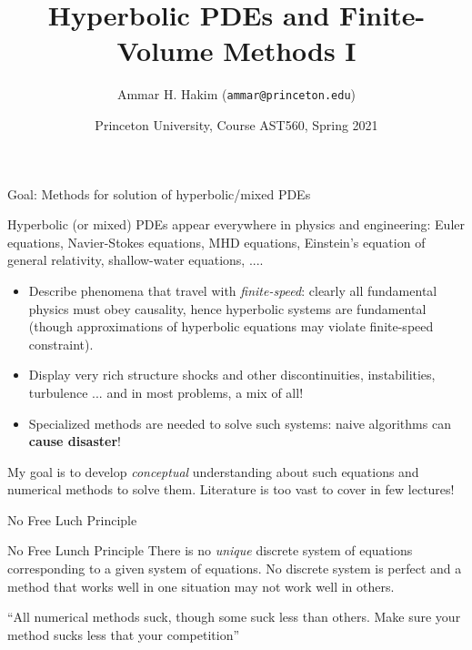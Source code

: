 \documentclass[aspectratio=169]{beamer}
\title[{\tt }]{Hyperbolic PDEs and Finite-Volume Methods I}%
\author[https://ast560.rtfd.io]%
{Ammar H. Hakim ({\tt ammar@princeton.edu}) \inst{1}}%
\institute[PPPL]
{ \inst{1} Princeton Plasma Physics Laboratory, Princeton, NJ %
}
\date[2/9/2021]{Princeton University, Course AST560, Spring 2021}
\newcommand{\mypause}{}
\begin{document}
\begin{frame}[plain]
  \titlepage
\end{frame}

\begin{frame}{Goal: Methods for solution of hyperbolic/mixed PDEs}

  Hyperbolic (or mixed) PDEs appear everywhere in physics and
  engineering: Euler equations, Navier-Stokes equations, MHD
  equations, Einstein's equation of general relativity, shallow-water
  equations, ....%
  \mypause%
  \begin{itemize}
  \item Describe phenomena that travel with \emph{finite-speed}:
    clearly all fundamental physics must obey causality, hence
    hyperbolic systems are fundamental (though approximations of
    hyperbolic equations may violate finite-speed constraint).
    \mypause%
  \item Display very rich structure shocks and other discontinuities,
    instabilities, turbulence ... and in most problems, a mix of all!
    \mypause%
  \item Specialized methods are needed to solve such systems: naive
    algorithms can {\bf cause disaster}!
  \end{itemize}
  \mypause%
  My goal is to develop \emph{conceptual} understanding about such
  equations and numerical methods to solve them. Literature is too
  vast to cover in few lectures!

\end{frame}

\begin{frame}{No Free Luch Principle}

  \begin{block}{No Free Lunch Principle}
    There is no \emph{unique} discrete system of equations
    corresponding to a given system of equations. No discrete system
    is perfect and a method that works well in one situation may not
    work well in others.
  \end{block}
  \vskip0.1in%
  \mypause%
  ``All numerical methods suck, though some suck less than
  others. Make sure your method sucks less that your competition''
  
\end{frame}
\end{document}
